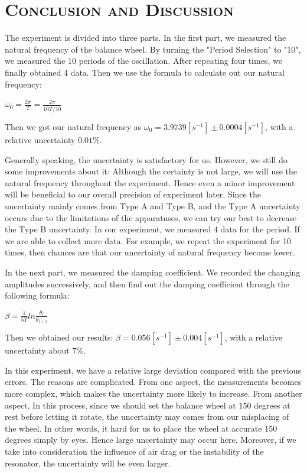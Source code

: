 \documentclass[a4paper,12pt]{article}
\begin{document}
\section{\textsc{Conclusion and Discussion}}
The experiment is divided into three parts. In the first part, we measured the natural frequency of the balance wheel. By turning the "Period Selection" to "10", we measured the 10 periods of the oscillation. After repeating four times, we finally obtained 4 data. Then we use the formula to calculate out our natural frequency: 
\begin{center}
$\displaystyle \omega_0 = \frac{2\pi}{T} = \frac{2\pi}{\overline{10T}/10}$
\end{center}
Then we got our natural frequency as $\displaystyle \omega_0 = 3.9739 [s^{-1}] \pm 0.0004[s^{-1}]$, with a relative uncertainty $0.01\%$. 
\par Generally speaking, the uncertainty is satisfactory for us. However, we still do some improvements about it: Although the certainty is not large, we will use the natural frequency throughout the experiment. Hence even a minor improvement will be beneficial to our overall precision of experiment later. Since the uncertainty mainly comes from Type A and Type B, and the Type A uncertainty occurs due to the limitations of the apparatuses, we can try our best to decrease the Type B uncertainty. In our experiment, we measured 4 data for the period. If we are able to collect more data. For example, we repeat the experiment for 10 times, then chances are that our uncertainty of natural frequency become lower. 
\par In the next part, we measured the damping coefficient. We recorded the changing amplitudes successively, and then find out the damping coefficient through the following formula:
\begin{center}
$\displaystyle \beta = \frac{1}{5T}ln\frac{\theta_i}{\theta_{i+5}}$
\end{center}
Then we obtained our results: $\displaystyle \beta = 0.056 [s^{-1}] \pm 0.004[s^{-1}]$, with a relative uncertainty about $7\%$.
\par In this experiment, we have a relative large deviation compared with the previous errors. The reasons are complicated. From one aspect, the measurements becomes more complex, which makes the uncertainty more likely to increase. From another aspect, In this process, since we should set the balance wheel at 150 degrees at rest before letting it rotate, the uncertainty may comes from our misplacing of the wheel. In other words, it hard for us to place the wheel at accurate 150 degrees simply by eyes. Hence large uncertainty may occur here. Moreover, if we take into consideration the influence of air drag or the instability of the resonator, the uncertainty will be even larger. 
\end{document}
